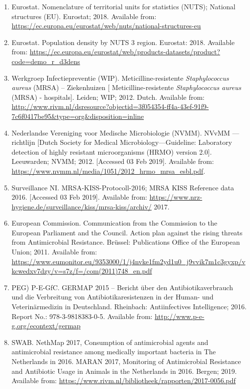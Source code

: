 \documentclass[
]{book}
\begin{document}
\begin{enumerate}
\item
  Eurostat. Nomenclature of territorial units for statistics (NUTS); National structures (EU). Eurostat; 2018. Available from: \url{https://ec.europa.eu/eurostat/web/nuts/national-structures-eu}
\item
  Eurostat. Population density by NUTS 3 region. Eurostat: 2018. Available from: \url{https://ec.europa.eu/eurostat/web/products-datasets/product?code=demo_r_d3dens}
\item
  Werkgroep Infectiepreventie (WIP). Meticilline-resistente \emph{Staphylococcus aureus} (MRSA) -- Ziekenhuizen {[} Meticilline-resistente \emph{Staphylococcus aureus} (MRSA) - hospitals{]}. Leiden; WIP; 2012. Dutch. Available from: \url{http://www.rivm.nl/dsresource?objectid=3f054354-ff4a-43ef-91f9-7c6f0417be95\&type=org\&disposition=inline}
\item
  Nederlandse Vereniging voor Medische Microbiologie (NVMM). NVvMM ---richtlijn {[}Dutch Society for Medical Microbiology---Guideline: Laboratory detection of highly resistant microorganisms (HRMO) version 2.0{]}. Leeuwarden; NVMM; 2012. {[}Accessed 03 Feb 2019{]}. Available from: \url{https://www.nvmm.nl/media/1051/2012_hrmo_mrsa_esbl.pdf}.
\item
  Surveillance NI. MRSA-KISS-Protocoll-2016; MRSA KISS Reference data 2016. {[}Accessed 03 Feb 2019{]}. Available from: \url{https://www.nrz-hygiene.de/surveillance/kiss/mrsa-kiss/archiv/} 2017.
\item
  European Commission. Communication from the Commission to the European Parliament and the Council. Action plan against the rising threats from Antimicrobial Resistance. Brüssel: Publications Office of the European Union; 2011. Available from: \url{https://www.eumonitor.eu/9353000/1/j4nvke1fm2yd1u0_j9vvik7m1c3gyxp/vkcwedxv7dzy/v=s7z/f=/com(2011)748_en.pdf}
\item
  PEG) P-E-GfC. GERMAP 2015 -- Bericht über den Antibiotikaverbrauch und die Verbreitung von Antibiotikaresistenzen in der Human- und Veterinärmedizin in Deutschland. Rheinbach: Antiinfectives Intelligence; 2016. Report No.: 978-3-9818383-0-5. Available from: \url{http://www.p-e-g.org/econtext/germap}
\item
  SWAB. NethMap 2017, Consumption of antimicrobial agents and antimicrobial resistance among medically important bacteria in The Netherlands in 2016. MARAN 2017, Monitoring of Antimicrobial Resistance and Antibiotic Usage in Animals in the Netherlands in 2016. Bergen; 2019. Available from: \url{https://www.rivm.nl/bibliotheek/rapporten/2017-0056.pdf}

\end{enumerate}
\end{document}
